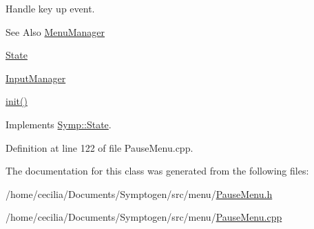 Handle key up event. 

\begin{DoxySeeAlso}{See Also}
\hyperlink{class_symp_1_1_menu_manager}{Menu\-Manager} 

\hyperlink{class_symp_1_1_state}{State} 

\hyperlink{class_symp_1_1_input_manager}{Input\-Manager} 

\hyperlink{class_symp_1_1_pause_menu_af456bb275fc71d5a9ee3290e5d82cd90}{init()} 
\end{DoxySeeAlso}


Implements \hyperlink{class_symp_1_1_state_a67d0fc2a02808bbcfdb06935c3be404f}{Symp\-::\-State}.



Definition at line 122 of file Pause\-Menu.\-cpp.



The documentation for this class was generated from the following files\-:\begin{DoxyCompactItemize}
\item 
/home/cecilia/\-Documents/\-Symptogen/src/menu/\hyperlink{_pause_menu_8h}{Pause\-Menu.\-h}\item 
/home/cecilia/\-Documents/\-Symptogen/src/menu/\hyperlink{_pause_menu_8cpp}{Pause\-Menu.\-cpp}\end{DoxyCompactItemize}
